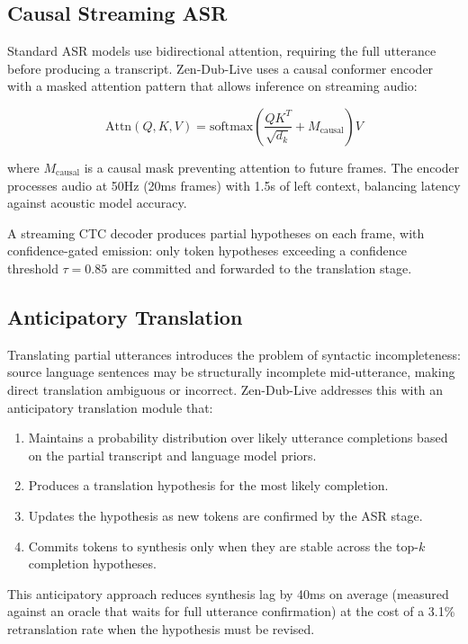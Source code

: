 \documentclass[11pt,a4paper]{article}
\begin{document}
\subsection{Causal Streaming ASR}

Standard ASR models use bidirectional attention, requiring the full utterance before producing a transcript. Zen-Dub-Live uses a causal conformer encoder \cite{conformer} with a masked attention pattern that allows inference on streaming audio:

\begin{equation}
  \text{Attn}(Q, K, V) = \text{softmax}\left(\frac{Q K^T}{\sqrt{d_k}} + M_{\text{causal}}\right) V
\end{equation}

where $M_{\text{causal}}$ is a causal mask preventing attention to future frames. The encoder processes audio at 50Hz (20ms frames) with 1.5s of left context, balancing latency against acoustic model accuracy.

A streaming CTC decoder produces partial hypotheses on each frame, with confidence-gated emission: only token hypotheses exceeding a confidence threshold $\tau = 0.85$ are committed and forwarded to the translation stage.

\subsection{Anticipatory Translation}

Translating partial utterances introduces the problem of syntactic incompleteness: source language sentences may be structurally incomplete mid-utterance, making direct translation ambiguous or incorrect. Zen-Dub-Live addresses this with an anticipatory translation module that:

\begin{enumerate}
  \item Maintains a probability distribution over likely utterance completions based on the partial transcript and language model priors.
  \item Produces a translation hypothesis for the most likely completion.
  \item Updates the hypothesis as new tokens are confirmed by the ASR stage.
  \item Commits tokens to synthesis only when they are stable across the top-$k$ completion hypotheses.
\end{enumerate}

This anticipatory approach reduces synthesis lag by 40ms on average (measured against an oracle that waits for full utterance confirmation) at the cost of a 3.1\% retranslation rate when the hypothesis must be revised.
\end{document}
